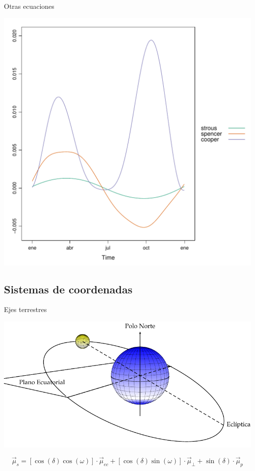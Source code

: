 \documentclass[xcolor={usenames,svgnames,dvipsnames}]{beamer}
\begin{document}
\begin{frame}[label={sec:org70460b5}]{Otras ecuaciones}
\begin{center}
\includegraphics[width=.9\linewidth]{../figs/DeclinacionDiferencias.pdf}
\end{center}
\end{frame}

\subsection{Sistemas de coordenadas}
\label{sec:org1b9e484}

\begin{frame}[label={sec:org9386545}]{Ejes terrestres}
\begin{center}
\includegraphics[width=.9\linewidth]{../figs/SoldesdeTierra.pdf}
\end{center}

\[\vec{\mu}_{s}=\left[\cos\left(\delta\right)\cos\left(\omega\right)\right]\cdot\vec{\mu}_{ec}+\left[\cos\left(\delta\right)\sin\left(\omega\right)\right]\cdot\vec{\mu}_{\bot}+\sin\left(\delta\right)\cdot\vec{\mu}_{p}\]
\end{frame}
\end{document}
